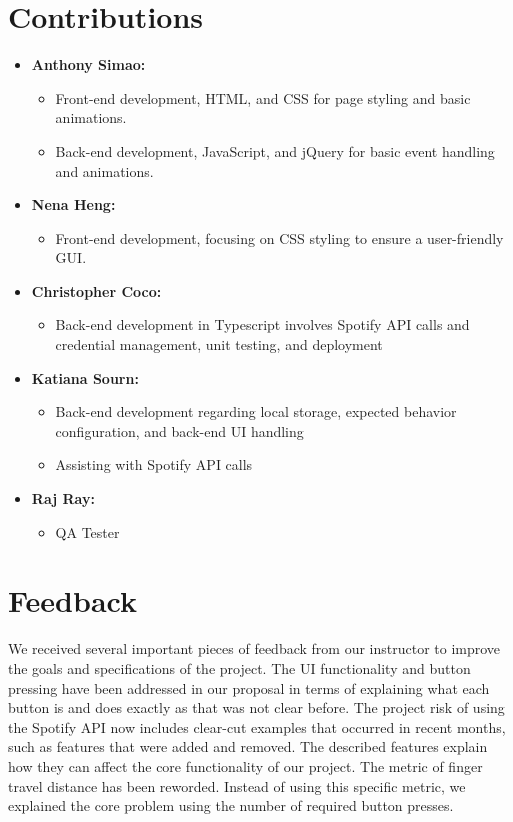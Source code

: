 \documentclass{article}
\begin{document}
\begin{appendices}
    \renewcommand{\thesection}{Appendix \Alph{section}:}
\section{Contributions}
\begin{itemize}
     \item \textbf{Anthony Simao:}
        \begin{itemize}
            \item Front-end development, HTML, and CSS for page styling and basic animations.
            \item Back-end development, JavaScript, and jQuery for basic event handling and animations.
        \end{itemize}
    \item \textbf{Nena Heng:}
        \begin{itemize}
            \item Front-end development, focusing on CSS styling to ensure a user-friendly GUI.
        \end{itemize}
    \item \textbf{Christopher Coco:}
        \begin{itemize}
            \item Back-end development in Typescript involves Spotify API calls and credential management, unit testing, and deployment
        \end{itemize}
    \item \textbf{Katiana Sourn:}
        \begin{itemize}
            \item Back-end development regarding local storage, expected behavior configuration, and back-end UI handling
            \item Assisting with Spotify API calls
        \end{itemize}
    \item \textbf{Raj Ray:}
        \begin{itemize}
            \item QA Tester
        \end{itemize}      
\end{itemize}
\section{Feedback}
\quad We received several important pieces of feedback from our instructor to improve the goals and specifications of the project. The UI functionality and button pressing have been addressed in our proposal in terms of explaining what each button is and does exactly as that was not clear before. The project risk of using the Spotify API now includes clear-cut examples that occurred in recent months, such as features that were added and removed. The described features explain how they can affect the core functionality of our project. The metric of finger travel distance has been reworded. Instead of using this specific metric, we explained the core problem using the number of required button presses. \\


\end{appendices}
\end{document}

